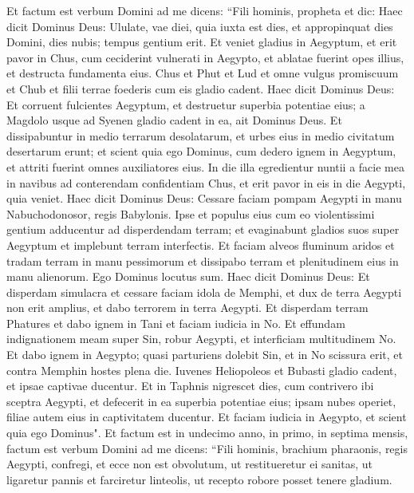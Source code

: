 \begin{biblechapter}  
\verse Et factum est verbum Domini ad me dicens: 
\verse “Fili hominis, propheta et dic: Haec dicit Dominus Deus: Ululate, vae diei, 
\verse quia iuxta est dies, et appropinquat dies Domini, dies nubis; tempus gentium erit. 
\verse Et veniet gladius in Aegyptum, et erit pavor in Chus, cum ceciderint vulnerati in Aegypto, et ablatae fuerint opes illius, et destructa fundamenta eius. 
\verse Chus et Phut et Lud et omne vulgus promiscuum et Chub et filii terrae foederis cum eis gladio cadent. 
\verse Haec dicit Dominus Deus: Et corruent fulcientes Aegyptum, et destruetur superbia potentiae eius; a Magdolo usque ad Syenen gladio cadent in ea, ait Dominus Deus. 
\verse Et dissipabuntur in medio terrarum desolatarum, et urbes eius in medio civitatum desertarum erunt; 
\verse et scient quia ego Dominus, cum dedero ignem in Aegyptum, et attriti fuerint omnes auxiliatores eius. 
\verse In die illa egredientur nuntii a facie mea in navibus ad conterendam confidentiam Chus, et erit pavor in eis in die Aegypti, quia veniet. 
\verse Haec dicit Dominus Deus: Cessare faciam pompam Aegypti in manu Nabuchodonosor, regis Babylonis. 
\verse Ipse et populus eius cum eo violentissimi gentium adducentur ad disperdendam terram; et evaginabunt gladios suos super Aegyptum et implebunt terram interfectis. 
\verse Et faciam alveos fluminum aridos et tradam terram in manu pessimorum et dissipabo terram et plenitudinem eius in manu alienorum. Ego Dominus locutus sum. 
\verse Haec dicit Dominus Deus: Et disperdam simulacra et cessare faciam idola de Memphi, et dux de terra Aegypti non erit amplius, et dabo terrorem in terra Aegypti. 
\verse Et disperdam terram Phatures et dabo ignem in Tani et faciam iudicia in No. 
\verse Et effundam indignationem meam super Sin, robur Aegypti, et interficiam multitudinem No. 
\verse Et dabo ignem in Aegypto; quasi parturiens dolebit Sin, et in No scissura erit, et contra Memphin hostes plena die. 
\verse Iuvenes Heliopoleos et Bubasti gladio cadent, et ipsae captivae ducentur. 
\verse Et in Taphnis nigrescet dies, cum contrivero ibi sceptra Aegypti, et defecerit in ea superbia potentiae eius; ipsam nubes operiet, filiae autem eius in captivitatem ducentur. 
\verse Et faciam iudicia in Aegypto, et scient quia ego Dominus". 
\verse Et factum est in undecimo anno, in primo, in septima mensis, factum est verbum Domini ad me dicens: 
\verse “Fili hominis, brachium pharaonis, regis Aegypti, confregi, et ecce non est obvolutum, ut restitueretur ei sanitas, ut ligaretur pannis et farciretur linteolis, ut recepto robore posset tenere gladium. 

\end{biblechapter}
